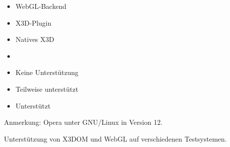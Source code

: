 \begin{table}[tbp]
\begin{minipage}{0.25\linewidth}
\begin{itemize}[leftmargin=*,label={}]
			\item\small{}\scriptsize\hspace{1.5ex}WebGL-Backend
		\end{itemize}
	\end{minipage}%
	\begin{minipage}{0.25\linewidth}%
		\vspace{1ex}
		\begin{itemize}[label={}]
			\scriptsize
			\itemsep0em
			\item\small{}\scriptsize\hspace{1.5ex}X3D-Plugin
			\item\small{}\scriptsize\hspace{1.5ex}Natives X3D
			\item%
		\end{itemize}
	\end{minipage}%
	\begin{minipage}{0.25\linewidth}%
		\vspace{1ex}
		\begin{itemize}[leftmargin=*,label={}]
			\scriptsize
			\itemsep0em
			\item\small{}\scriptsize\hspace{1.5ex}Keine Unterstützung
			\item\small{}\scriptsize\hspace{1.5ex}Teilweise unterstützt
			\item\small{}\scriptsize\hspace{1.5ex}Unterstützt
		\end{itemize}
	\end{minipage}%
	\vspace{0.5ex}%
	\center\scriptsize * Anmerkung: Opera unter GNU/Linux in Version 12.
	\vspace{0.5ex}%
	\caption{Unterstützung von X3DOM und WebGL auf verschiedenen Testsystemen.}
	\label{TAB_BROWSER_SUPPORT}
\end{table}


